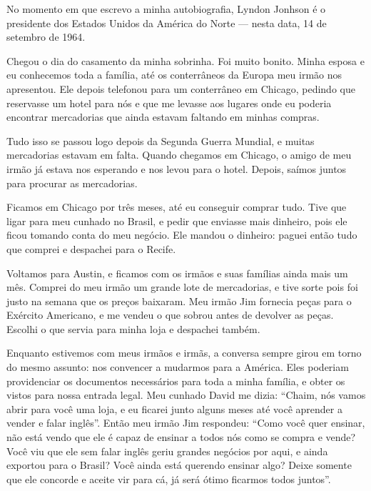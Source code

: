 
No momento em que escrevo a minha autobiografia, Lyndon
Jonhson é o presidente dos Estados Unidos da América do Norte --- nesta
data, 14 de setembro de 1964.

Chegou o dia do casamento da minha sobrinha. Foi muito bonito. Minha
esposa e eu conhecemos toda a família, até os conterrâneos da Europa
meu irmão nos apresentou. Ele depois telefonou para um conterrâneo
em Chicago, pedindo que reservasse um hotel para nós e que me levasse
aos lugares onde eu poderia encontrar mercadorias que ainda estavam
faltando em minhas compras. 

Tudo isso se passou logo depois da Segunda Guerra Mundial, e muitas mercadorias estavam em falta. Quando chegamos em Chicago, o amigo de meu irmão já estava nos esperando e nos
levou para o hotel. Depois, saímos juntos para procurar as mercadorias.

Ficamos em Chicago por três meses, até eu conseguir comprar tudo. Tive que
ligar para meu cunhado no Brasil, e pedir que enviasse mais dinheiro, pois ele ficou tomando conta do meu negócio. Ele mandou o dinheiro: 
paguei então tudo que comprei e despachei para o Recife.

Voltamos para Austin, e ficamos com os irmãos e suas famílias ainda mais
um mês. Comprei do meu irmão um grande lote de mercadorias, e tive
sorte pois foi justo na semana que os preços baixaram. Meu irmão Jim
fornecia peças para o Exército Americano, e me vendeu o que sobrou
antes de devolver as peças. Escolhi o que servia para minha loja e
despachei também.

Enquanto estivemos com meus irmãos e irmãs, a conversa sempre
girou em torno do mesmo assunto: nos convencer a mudarmos para a
América. Eles poderiam providenciar os documentos necessários para toda a 
minha família, e obter os vistos para nossa entrada legal. Meu cunhado
David me dizia: ``Chaim, nós vamos abrir para você uma loja, e eu ficarei
junto alguns meses até você aprender a vender e falar inglês''. Então
meu irmão Jim respondeu: ``Como você quer ensinar, não está vendo que
ele é capaz de ensinar a todos nós como se compra e vende? Você viu que
ele sem falar inglês geriu grandes negócios por aqui, e ainda
exportou para o Brasil? Você ainda está querendo ensinar algo?
Deixe somente que ele concorde e aceite vir para cá, já será ótimo
ficarmos todos juntos''.

